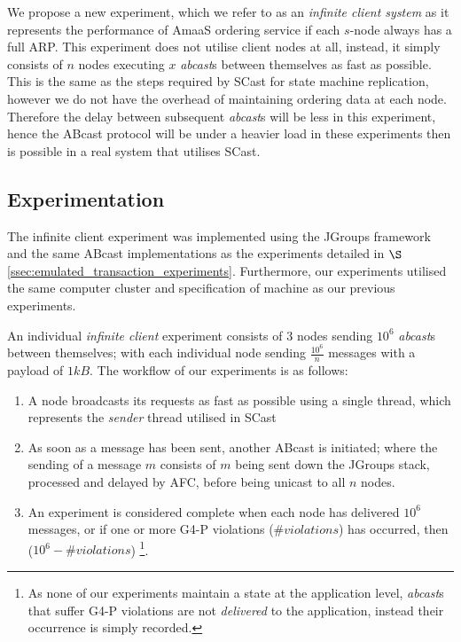     We propose a new experiment, which we refer to  as an \emph{infinite client system} as it represents the performance of \textsf{AmaaS} ordering service if each $s$-node always has a full ARP.  This experiment does not utilise client nodes at all, instead, it simply consists of $n$ nodes executing $x$ \emph{abcast}s between themselves as fast as possible.  This is the same as the steps required by \textsf{SCast} for state machine replication, however we do not have the overhead of maintaining ordering data at each node.  Therefore the delay between subsequent \emph{abcast}s will be less in this experiment, hence the \textsf{ABcast} protocol will be under a heavier load in these experiments then is possible in a real system that utilises \textsf{SCast}. 
    
    \subsection{Experimentation}\label{ssec: infinite_experimentation}
    The infinite client experiment was implemented using the JGroups framework and the same \textsf{ABcast} implementations as the experiments detailed in $\S$ \ref{ssec:emulated_transaction_experiments}.  Furthermore, our experiments utilised the same computer cluster and specification of machine as our previous experiments.  
    
    An individual \emph{infinite client} experiment consists of $3$ nodes sending $10^6$ \emph{abcast}s between themselves; with each individual node sending $\frac{10^6}{n}$ messages with a payload of $1kB$.  The workflow of our experiments is as follows:
    
    \begin{enumerate}
        \item    A node broadcasts its requests as fast as possible using a single thread, which represents the \emph{sender} thread utilised in \textsf{SCast}
        
        \item    As soon as a message has been sent, another \textsf{ABcast} is initiated; where the sending of a message $m$ consists of $m$ being sent down the JGroups stack, processed and delayed by AFC, before being unicast to all $n$ nodes.  
        
        \item    An experiment is considered complete when each node has delivered $10^6$ messages, or if one or more G4-P violations ($\#violations$) has occurred, then ($10^6 - \#violations$) \footnote{As none of our experiments maintain a state at the application level, \emph{abcast}s that suffer G4-P violations are not \emph{delivered} to the application, instead their occurrence is simply recorded.}.  
    \end{enumerate}
    

